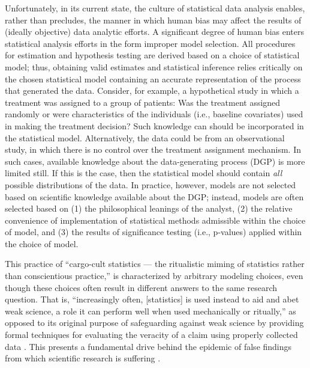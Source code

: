 \documentclass[12pt, krantz2,]{krantz}
\theoremstyle{definition}
\theoremstyle{definition}
\theoremstyle{definition}
\newcommand{\1}{\mathbbm{1}}
\begin{document}
Unfortunately, in its current state, the culture of statistical data analysis
enables, rather than precludes, the manner in which human bias may affect the
results of (ideally objective) data analytic efforts. A significant degree of
human bias enters statistical analysis efforts in the form improper model
selection. All procedures for estimation and hypothesis testing are derived
based on a choice of statistical model; thus, obtaining valid estimates and
statistical inference relies critically on the chosen statistical model
containing an accurate representation of the process that generated the data.
Consider, for example, a hypothetical study in which a treatment was assigned to
a group of patients: Was the treatment assigned randomly or were characteristics
of the individuals (i.e., baseline covariates) used in making the treatment
decision? Such knowledge can should be incorporated in the statistical model.
Alternatively, the data could be from an observational study, in which there is
no control over the treatment assignment mechanism. In such cases, available
knowledge about the data-generating process (DGP) is more limited still. If
this is the case, then the statistical model should contain \emph{all} possible
distributions of the data. In practice, however, models are not selected based
on scientific knowledge available about the DGP; instead, models are often
selected based on (1) the philosophical leanings of the analyst, (2) the
relative convenience of implementation of statistical methods admissible within
the choice of model, and (3) the results of significance testing (i.e.,
p-values) applied within the choice of model.

This practice of ``cargo-cult statistics --- the ritualistic miming of statistics
rather than conscientious practice,'' \citep{stark2018cargo} is characterized by
arbitrary modeling choices, even though these choices often result in different
answers to the same research question. That is, ``increasingly often,
{[}statistics{]} is used instead to aid and abet weak science, a role it can perform
well when used mechanically or ritually,'' as opposed to its original purpose of
safeguarding against weak science by providing formal techniques for evaluating
the veracity of a claim using properly collected data \citep{stark2018cargo}. This
presents a fundamental drive behind the epidemic of false findings from which
scientific research is suffering \citep{vdl2014entering}.
\end{document}
